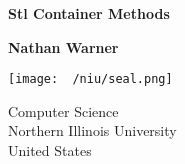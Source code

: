 \documentclass{report}
\title{\Huge{}}
\author{\huge{Nathan Warner}}
\date{\huge{}}
\begin{document}
        \begin{titlepage}
       \begin{center}
           \vspace*{1cm}
    
           \textbf{Stl Container Methods}
    
           \vspace{0.5cm}
            
                
           \vspace{1.5cm}
    
           \textbf{Nathan Warner}
    
           \vfill
                
                
           \vspace{0.8cm}
         
           \texttt{[image: ~/niu/seal.png]}
                
           Computer Science \\
           Northern Illinois University\\
           United States\\
           
                
       \end{center}
    \end{titlepage}
    \tableofcontents
    \pagebreak 
     \bigbreak \noindent 
\end{document}
